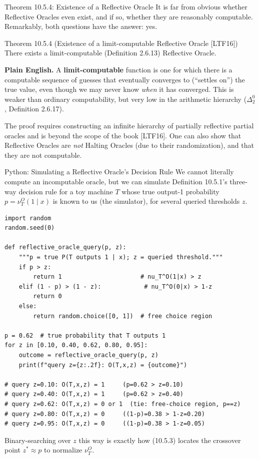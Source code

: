 \documentclass[aspectratio=169,10pt]{beamer}
\begin{document}
\begin{frame}{Theorem 10.5.4: Existence of a Reflective Oracle}
  It is far from obvious whether Reflective Oracles even exist, and if so,
  whether they are reasonably computable. Remarkably, both questions have
  the answer: yes.
  \begin{block}{Theorem 10.5.4 (Existence of a limit-computable Reflective Oracle {\footnotesize[LTF16]})}
    There exists a limit-computable (Definition 2.6.13) Reflective Oracle.
  \end{block}
  \textbf{Plain English.} A \textbf{limit-computable} function is one for
  which there is a computable sequence of guesses that eventually
  converges to (``settles on'') the true value, even though we may never
  know \emph{when} it has converged. This is weaker than ordinary
  computability, but very low in the arithmetic hierarchy ($\Delta_2^0$,
  Definition 2.6.17).

  \vspace{0.3em}
  The proof requires constructing an infinite hierarchy of partially
  reflective partial oracles and is beyond the scope of the book
  {\footnotesize[LTF16]}. One can also show that Reflective Oracles are
  \emph{not} Halting Oracles (due to their randomization), and that they
  are not computable.
\end{frame}

\begin{frame}[fragile]{Python: Simulating a Reflective Oracle's Decision Rule}
  We cannot literally compute an incomputable oracle, but we can simulate
  Definition 10.5.1's three-way decision rule for a toy machine $T$ whose
  true output-1 probability $p=\nu_T^O(1\mid x)$ is known to us (the
  simulator), for several queried thresholds $z$.
  \begin{lstlisting}[style=pycode]
import random
random.seed(0)

def reflective_oracle_query(p, z):
    """p = true P(T outputs 1 | x); z = queried threshold."""
    if p > z:
        return 1                      # nu_T^O(1|x) > z
    elif (1 - p) > (1 - z):            # nu_T^O(0|x) > 1-z
        return 0
    else:
        return random.choice([0, 1])  # free choice region

p = 0.62  # true probability that T outputs 1
for z in [0.10, 0.40, 0.62, 0.80, 0.95]:
    outcome = reflective_oracle_query(p, z)
    print(f"query z={z:.2f}: O(T,x,z) = {outcome}")

# query z=0.10: O(T,x,z) = 1     (p=0.62 > z=0.10)
# query z=0.40: O(T,x,z) = 1     (p=0.62 > z=0.40)
# query z=0.62: O(T,x,z) = 0 or 1  (tie: free-choice region, p==z)
# query z=0.80: O(T,x,z) = 0     ((1-p)=0.38 > 1-z=0.20)
# query z=0.95: O(T,x,z) = 0     ((1-p)=0.38 > 1-z=0.05)
  \end{lstlisting}
  Binary-searching over $z$ this way is exactly how (10.5.3) locates the
  crossover point $z^*\approx p$ to normalize $\nu_T^O$.
\end{frame}
\end{document}
